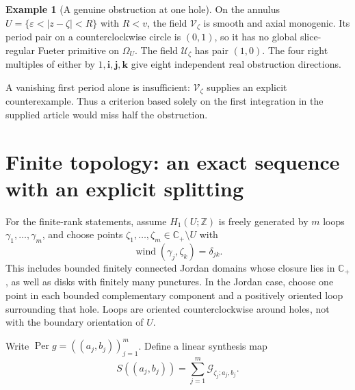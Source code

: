 \documentclass[11pt,a4paper]{article}
\numberwithin{equation}{section}
\theoremstyle{definition}
\newtheorem{example}[theorem]{Example}
\theoremstyle{remark}
\newcommand{\C}{\mathbb C}
\newcommand{\Cp}{\C_+}
\newcommand{\ii}{\mathbf i}
\newcommand{\jj}{\mathbf j}
\newcommand{\kk}{\mathbf k}
\newcommand{\Per}{\operatorname{Per}}
\newcommand{\wind}{\operatorname{wind}}
\newcommand{\G}{\mathcal G}
\newcommand{\Uker}{\mathcal U}
\newcommand{\Vker}{\mathcal V}
\newcommand{\Hone}{H_1}
\newcommand{\Z}{\mathbb Z}
\begin{document}
\begin{example}[A genuine obstruction at one hole]\label{ex:annulus}
On the annulus $U=\{\varepsilon<|z-\zeta|<R\}$ with $R<v$, the field
$\Vker_\zeta$ is smooth and axial monogenic. Its period pair on a
counterclockwise circle is $(0,1)$, so it has no global slice-regular
Fueter primitive on $\Omega_U$. The field $\Uker_\zeta$ has pair $(1,0)$.
The four right multiples of either by $1,\ii,\jj,\kk$ give eight
independent real obstruction directions.
\end{example}

A vanishing first period alone is insufficient: $\Vker_\zeta$ supplies
an explicit counterexample. Thus a criterion based solely on the first
integration in the supplied article would miss half the obstruction.

\section{Finite topology: an exact sequence with an explicit splitting}
\label{sec:split}

For the finite-rank statements, assume $\Hone(U;\Z)$ is freely generated
by $m$ loops $\gamma_1,\ldots,\gamma_m$, and choose points
$\zeta_1,\ldots,\zeta_m\in\Cp\setminus U$ with
\begin{equation}\label{eq:winding-basis}
 \wind(\gamma_j,\zeta_k)=\delta_{jk}.
\end{equation}
This includes bounded finitely connected Jordan domains whose closure
lies in $\Cp$, as well as disks with finitely many punctures. In the
Jordan case, choose one point in each bounded complementary component
and a positively oriented loop surrounding that hole. Loops are oriented
counterclockwise around holes, not with the boundary orientation of $U$.

Write $\Per g=((a_j,b_j))_{j=1}^m$. Define a linear synthesis map
\begin{equation}\label{eq:S}
 S((a_j,b_j))=\sum_{j=1}^m\G_{\zeta_j;a_j,b_j}.
\end{equation}
\end{document}
